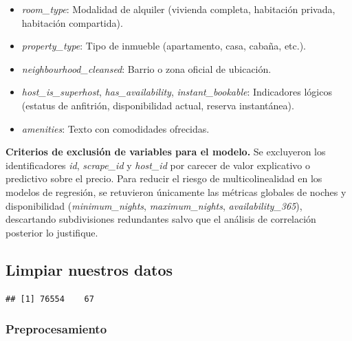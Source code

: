 \documentclass[
]{article}
\providecommand{\tightlist}{%
  \setlength{\itemsep}{0pt}\setlength{\parskip}{0pt}}
\begin{document}
\begin{itemize}
\tightlist
\item
  \emph{room\_type}: Modalidad de alquiler (vivienda completa,
  habitación privada, habitación compartida).
\item
  \emph{property\_type}: Tipo de inmueble (apartamento, casa, cabaña,
  etc.).
\item
  \emph{neighbourhood\_cleansed}: Barrio o zona oficial de ubicación.
\item
  \emph{host\_is\_superhost}, \emph{has\_availability},
  \emph{instant\_bookable}: Indicadores lógicos (estatus de anfitrión,
  disponibilidad actual, reserva instantánea).
\item
  \emph{amenities}: Texto con comodidades ofrecidas.
\end{itemize}

\textbf{Criterios de exclusión de variables para el modelo.} Se
excluyeron los identificadores \emph{id}, \emph{scrape\_id} y
\emph{host\_id} por carecer de valor explicativo o predictivo sobre el
precio. Para reducir el riesgo de multicolinealidad en los modelos de
regresión, se retuvieron únicamente las métricas globales de noches y
disponibilidad (\emph{minimum\_nights}, \emph{maximum\_nights},
\emph{availability\_365}), descartando subdivisiones redundantes salvo
que el análisis de correlación posterior lo justifique.

\subsection{Limpiar nuestros datos}\label{limpiar-nuestros-datos}

\begin{verbatim}
## [1] 76554    67
\end{verbatim}

\subsubsection{Preprocesamiento}\label{preprocesamiento}
\end{document}
